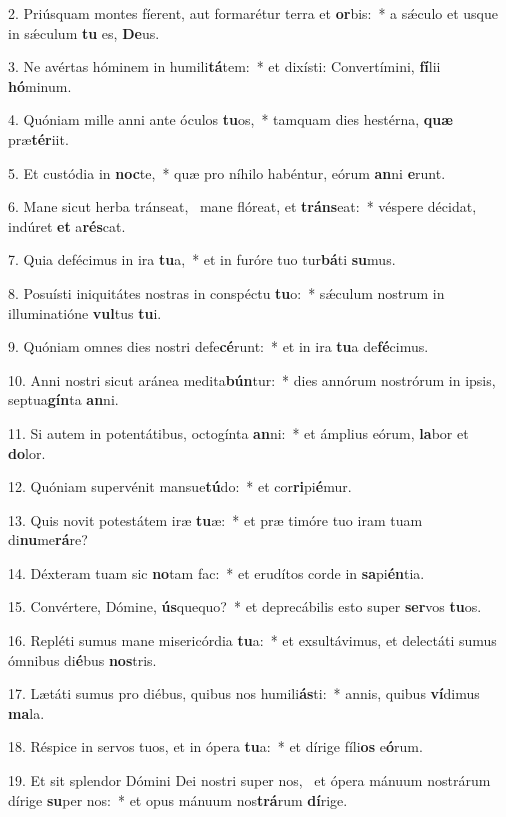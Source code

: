 2. Priúsquam montes fíerent, aut formarétur terra et \textbf{or}bis:~*  a sǽculo et usque in sǽculum \textbf{tu} es, \textbf{De}us.\

3. Ne avértas hóminem in humili\textbf{tá}tem:~*  et dixísti: Convertímini, \textbf{fí}lii \textbf{hó}minum.\

4. Quóniam mille anni ante óculos \textbf{tu}os,~*  tamquam dies hestérna, \textbf{quæ} præ\textbf{tér}iit.\

5. Et custódia in \textbf{noc}te,~*  quæ pro níhilo habéntur, eórum \textbf{an}ni \textbf{e}runt.\

6. Mane sicut herba tránseat, \dag\  mane flóreat, et \textbf{tráns}eat:~*  véspere décidat, indúret \textbf{et} a\textbf{rés}cat.\

7. Quia defécimus in ira \textbf{tu}a,~*  et in furóre tuo tur\textbf{bá}ti \textbf{su}mus.\

8. Posuísti iniquitátes nostras in conspéctu \textbf{tu}o:~*  sǽculum nostrum in illuminatióne \textbf{vul}tus \textbf{tu}i.\

9. Quóniam omnes dies nostri defe\textbf{cé}runt:~*  et in ira \textbf{tu}a de\textbf{fé}cimus.\

10. Anni nostri sicut aránea medita\textbf{bún}tur:~*  dies annórum nostrórum in ipsis, septua\textbf{gín}ta \textbf{an}ni.\

11. Si autem in potentátibus, octogínta \textbf{an}ni:~*  et ámplius eórum, \textbf{la}bor et \textbf{do}lor.\

12. Quóniam supervénit mansue\textbf{tú}do:~*  et cor\textbf{ri}pi\textbf{é}mur.\

13. Quis novit potestátem iræ \textbf{tu}æ:~*  et præ timóre tuo iram tuam di\textbf{nu}me\textbf{rá}re?\

14. Déxteram tuam sic \textbf{no}tam fac:~*  et erudítos corde in \textbf{sa}pi\textbf{én}tia.\

15. Convértere, Dómine, \textbf{ús}quequo?~*  et deprecábilis esto super \textbf{ser}vos \textbf{tu}os.\

16. Repléti sumus mane misericórdia \textbf{tu}a:~*  et exsultávimus, et delectáti sumus ómnibus di\textbf{é}bus \textbf{nos}tris.\

17. Lætáti sumus pro diébus, quibus nos humili\textbf{ás}ti:~*  annis, quibus \textbf{ví}dimus \textbf{ma}la.\

18. Réspice in servos tuos, et in ópera \textbf{tu}a:~*  et dírige fíli\textbf{os} e\textbf{ó}rum.\

19. Et sit splendor Dómini Dei nostri super nos, \dag\  et ópera mánuum nostrárum dírige \textbf{su}per nos:~*  et opus mánuum nos\textbf{trá}rum \textbf{dí}rige.\

